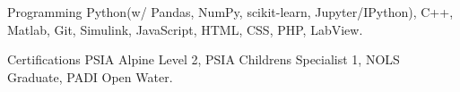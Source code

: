 

\begin{cvskills}

  \cvskill
    {Programming} %
    {Python(w/ Pandas, NumPy, scikit-learn, Jupyter/IPython), C++, Matlab, Git, Simulink, JavaScript, HTML, CSS, PHP, LabView.}  %

  \cvskill
    {Certifications} %
    {PSIA Alpine Level 2, PSIA Childrens Specialist 1, NOLS Graduate, PADI Open Water.} %

\end{cvskills}
